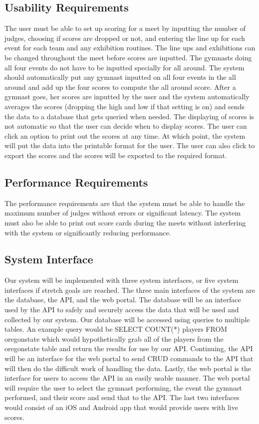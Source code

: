\documentclass[letterpaper,10pt,draftclsnofoot,onecolumn,]{article}
\begin{document}
\subsection{Usability Requirements}
The user must be able to set up scoring for a meet by inputting the number of judges, choosing if scores are dropped or not, and entering the line up for each event for each team and any exhibition routines. The line ups and exhibitions can be changed throughout the meet before scores are inputted. The gymnasts doing all four events do not have to be inputted specially for all around. The system should automatically put any gymnast inputted on all four events in the all around and add up the four scores to compute the all around score. After a gymnast goes, her scores are inputted by the user and the system automatically averages the scores (dropping the high and low if that setting is on) and sends the data to a database that gets queried when needed. The displaying of scores is not automatic so that the user can decide when to display scores. The user can click an option to print out the scores at any time. At which point, the system will put the data into the printable format for the user. The user can also click to export the scores and the scores will be exported to the required format.\\

\subsection{Performance Requirements}
The performance requirements are that the system must be able to handle the maximum number of judges without errors or significant latency. The system must also be able to print out score cards during the meets without interfering with the system or significantly reducing performance.

\subsection{System Interface}
Our system will be implemented with three system interfaces, or five system interfaces if stretch goals are reached. The three main interfaces of the system are the database, the API, and the web portal. The database will be an interface used by the API to safely and securely access the data that will be used and collected by our system. Our database will be accessed using queries to multiple tables. An example query would be {\selectfont SELECT COUNT(*) players FROM oregonstate} which would hypothetically grab all of the players from the oregonstate table and return the results for use by our API. Continuing, the API will be an interface for the web portal to send CRUD commands to the API that will then do the difficult work of handling the data. Lastly, the web portal is the interface for users to access the API in an easily usable manner. The web portal will require the user to select the gymnast performing, the event the gymnast performed, and their score and send that to the API. The last two interfaces would consist of an iOS and Android app that would provide users with live scores.
\end{document}
